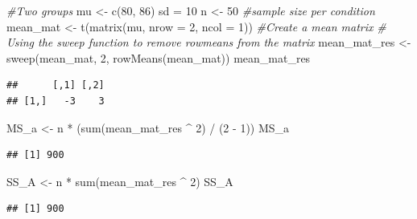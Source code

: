 \documentclass[
]{book}
\newenvironment{Shaded}{\begin{snugshade}}{\end{snugshade}}
\newcommand{\AttributeTok}[1]{\textcolor[rgb]{0.77,0.63,0.00}{#1}}
\newcommand{\CommentTok}[1]{\textcolor[rgb]{0.56,0.35,0.01}{\textit{#1}}}
\newcommand{\DecValTok}[1]{\textcolor[rgb]{0.00,0.00,0.81}{#1}}
\newcommand{\FunctionTok}[1]{\textcolor[rgb]{0.00,0.00,0.00}{#1}}
\newcommand{\NormalTok}[1]{#1}
\newcommand{\OtherTok}[1]{\textcolor[rgb]{0.56,0.35,0.01}{#1}}
\newcommand{\SpecialCharTok}[1]{\textcolor[rgb]{0.00,0.00,0.00}{#1}}
\begin{document}
\begin{Shaded}
\begin{Highlighting}[]
\CommentTok{\#Two groups}
\NormalTok{mu }\OtherTok{\textless{}{-}} \FunctionTok{c}\NormalTok{(}\DecValTok{80}\NormalTok{, }\DecValTok{86}\NormalTok{)}
\NormalTok{sd }\OtherTok{=} \DecValTok{10}
\NormalTok{n }\OtherTok{\textless{}{-}} \DecValTok{50} \CommentTok{\#sample size per condition}
\NormalTok{mean\_mat }\OtherTok{\textless{}{-}} \FunctionTok{t}\NormalTok{(}\FunctionTok{matrix}\NormalTok{(mu, }\AttributeTok{nrow =} \DecValTok{2}\NormalTok{, }\AttributeTok{ncol =} \DecValTok{1}\NormalTok{)) }\CommentTok{\#Create a mean matrix}
\CommentTok{\# Using the sweep function to remove rowmeans from the matrix}
\NormalTok{mean\_mat\_res }\OtherTok{\textless{}{-}} \FunctionTok{sweep}\NormalTok{(mean\_mat, }\DecValTok{2}\NormalTok{, }\FunctionTok{rowMeans}\NormalTok{(mean\_mat))}
\NormalTok{mean\_mat\_res}
\end{Highlighting}
\end{Shaded}

\begin{verbatim}
##      [,1] [,2]
## [1,]   -3    3
\end{verbatim}

\begin{Shaded}
\begin{Highlighting}[]
\NormalTok{MS\_a }\OtherTok{\textless{}{-}}\NormalTok{ n }\SpecialCharTok{*}\NormalTok{ (}\FunctionTok{sum}\NormalTok{(mean\_mat\_res }\SpecialCharTok{\^{}} \DecValTok{2}\NormalTok{) }\SpecialCharTok{/}\NormalTok{ (}\DecValTok{2} \SpecialCharTok{{-}} \DecValTok{1}\NormalTok{))}
\NormalTok{MS\_a}
\end{Highlighting}
\end{Shaded}

\begin{verbatim}
## [1] 900
\end{verbatim}

\begin{Shaded}
\begin{Highlighting}[]
\NormalTok{SS\_A }\OtherTok{\textless{}{-}}\NormalTok{ n }\SpecialCharTok{*} \FunctionTok{sum}\NormalTok{(mean\_mat\_res }\SpecialCharTok{\^{}} \DecValTok{2}\NormalTok{)}
\NormalTok{SS\_A}
\end{Highlighting}
\end{Shaded}

\begin{verbatim}
## [1] 900
\end{verbatim}
\end{document}
